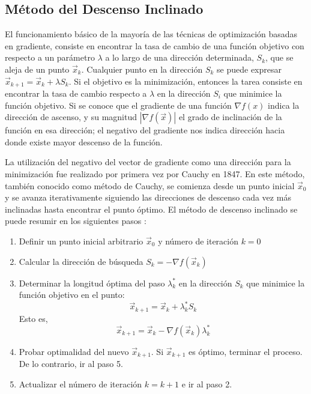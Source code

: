 \subsection{Método del Descenso Inclinado}
El funcionamiento básico de  la mayoría de las técnicas de optimización basadas en gradiente, consiste en encontrar la tasa de cambio de una función objetivo con respecto a un parámetro $\lambda$ a lo largo de una dirección determinada, $S_k$, que se aleja de un punto $\vec{x}_k$. Cualquier punto en la dirección $S_k$ se puede expresar $\vec{x}_{k+1}=\vec{x}_k+ \lambda S_k$. Si el objetivo es la minimización, entonces la tarea consiste en encontrar la tasa de cambio respecto a $\lambda$ en la dirección $S_i$ que minimice la función objetivo. Si se conoce que el gradiente de una función $\nabla f(x)$ indica la dirección de ascenso, y su magnitud $|\nabla f(\vec{x})|$ el grado de inclinación de la función en esa dirección; el negativo del gradiente nos indica dirección hacia donde existe mayor descenso de la función. 

La utilización del negativo del vector de gradiente como una dirección para la minimización fue realizado por primera vez por Cauchy en 1847. En este método, también conocido como método de Cauchy, se comienza desde un punto inicial $\vec{x}_0$ y se avanza iterativamente siguiendo las direcciones de descenso cada vez más inclinadas hasta encontrar el punto óptimo. El método de descenso inclinado se puede resumir en los siguientes pasos \cite{rao_engineering_2009}:
\begin{enumerate}
\item Definir un punto inicial arbitrario $\vec{x}_0$ y número de iteración $k =0$
\item Calcular la dirección de búsqueda $S_k = -\nabla f(\vec{x}_k)$
\item Determinar la longitud óptima del paso $\lambda^*_k$ en la dirección $S_k$ que minimice la función objetivo en el punto:
\begin{equation}
\vec{x}_{k+1} = \vec{x}_k +\lambda^*_k S_k
\end{equation}
Esto es,
\begin{equation}\label{eq:Cauchy Mehtod Eq}
\vec{x}_{k+1} = \vec{x}_k -\nabla f(\vec{x}_k)\lambda^*_k
\end{equation}
\item Probar optimalidad del nuevo $\vec{x}_{k+1}$. Si $\vec{x}_{k+1} $ es óptimo, terminar el proceso. De lo contrario, ir al paso 5.
\item Actualizar el número de iteración $k = k +1$ e ir al paso 2.
\end{enumerate}


